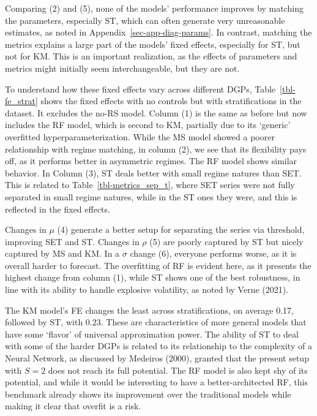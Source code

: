 \documentclass[
  letterpaper,
  DIV=11,
  numbers=noendperiod]{scrartcl}
\numberwithin{equation}{section}
\numberwithin{table}{section}
\numberwithin{figure}{section}
\begin{document}
Comparing (2) and (5), none of the models' performance improves by
matching the parameters, especially ST, which can often generate very
unreasonable estimates, as noted in Appendix~\ref{sec-app-diag-params}.
In contrast, matching the metrics explains a large part of the models'
fixed effects, especially for ST, but not for KM. This is an important
realization, as the effects of parameters and metrics might initially
seem interchangeable, but they are not.

\begin{table}[!htbp]

\caption{\label{tbl-fe_base}Models' fixed effects - baseline and
controls}

\centering{



}

\end{table}%

To understand how these fixed effects vary across different DGPs,
Table~\ref{tbl-fe_strat} shows the fixed effects with no controls but
with stratifications in the dataset. It excludes the no-RS model. Column
(1) is the same as before but now includes the RF model, which is second
to KM, partially due to its `generic' overfitted hyperparameterization.
While the MS model showed a poorer relationship with regime matching, in
column (2), we see that its flexibility pays off, as it performs better
in asymmetric regimes. The RF model shows similar behavior. In Column
(3), ST deals better with small regime natures than SET. This is related
to Table~\ref{tbl-metrics_sep_t}, where SET series were not fully
separated in small regime natures, while in the ST ones they were, and
this is reflected in the fixed effects.

Changes in \(\mu\) (4) generate a better setup for separating the series
via threshold, improving SET and ST. Changes in \(\rho\) (5) are poorly
captured by ST but nicely captured by MS and KM. In a \(\sigma\) change
(6), everyone performs worse, as it is overall harder to forecast. The
overfitting of RF is evident here, as it presents the highest change
from column (1), while ST shows one of the best robustness, in line with
its ability to handle explosive volatility, as noted by Verne (2021).

The KM model's FE changes the least across stratifications, on average
0.17, followed by ST, with \(0.23\). These are characteristics of more
general models that have some `flavor' of universal approximation power.
The ability of ST to deal with some of the harder DGPs is related to its
relationship to the complexity of a Neural Network, as discussed by
Medeiros (2000), granted that the present setup with \(S = 2\) does not
reach its full potential. The RF model is also kept shy of its
potential, and while it would be interesting to have a
better-architected RF, this benchmark already shows its improvement over
the traditional models while making it clear that overfit is a risk.
\end{document}
